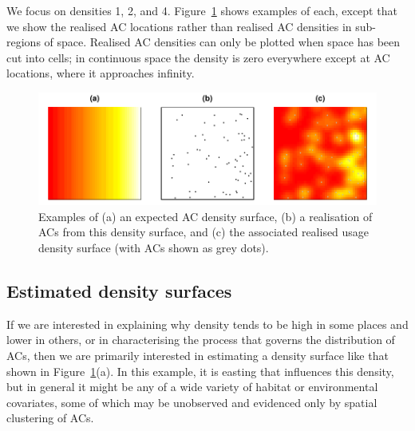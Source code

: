 \documentclass[10pt,a4paper]{article}
\begin{document}
We focus on densities 1, 2, and 4. Figure~\ref{fig:densities} shows examples of each, except that we show the realised AC locations rather than realised AC densities in sub-regions of space. Realised AC densities can only be plotted when space has been cut into cells; in continuous space the density is zero everywhere except at AC locations, where it approaches infinity.

\begin{figure}[htbp]
\centering
\includegraphics[width=\textwidth]{densities.pdf}
\caption{Examples of (a) an expected AC density surface, (b) a realisation of ACs from this density surface, and (c) the associated realised usage density surface (with ACs shown as grey dots).}
\label{fig:densities}
\end{figure}

\subsection{Estimated density surfaces}

If we are interested in explaining why density tends to be high in some places and lower in others, or in characterising the process that governs the distribution of ACs, then we are primarily interested in estimating a density surface like that shown in Figure~\ref{fig:densities}(a). In this example, it is easting that influences this density, but in general it might be any of a wide variety of habitat or environmental covariates, some of which may be unobserved and evidenced only by spatial clustering of ACs. 
\end{document}

